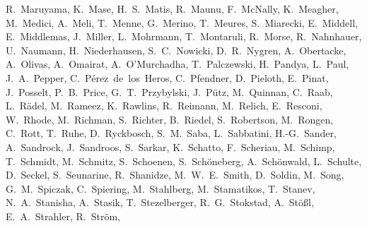 \documentclass[manuscript]{aastex}
\begin{document}
{R.~Maruyama,
K.~Mase,
H.~S.~Matis,
R.~Maunu,
F.~McNally,
K.~Meagher,
M.~Medici,
A.~Meli,
T.~Menne,
G.~Merino,
T.~Meures,
S.~Miarecki,
E.~Middell,
E.~Middlemas,
J.~Miller,
L.~Mohrmann,
T.~Montaruli,
R.~Morse,
R.~Nahnhauer,
U.~Naumann,
H.~Niederhausen,
S.~C.~Nowicki,
D.~R.~Nygren,
A.~Obertacke,
A.~Olivas,
A.~Omairat,
A.~O'Murchadha,
T.~Palczewski,
H.~Pandya,
L.~Paul,
J.~A.~Pepper,
C.~P\'erez~de~los~Heros,
C.~Pfendner,
D.~Pieloth,
E.~Pinat,
J.~Posselt,
P.~B.~Price,
G.~T.~Przybylski,
J.~P\"utz,
M.~Quinnan,
C.~Raab,
L.~R\"adel,
M.~Rameez,
K.~Rawlins,
R.~Reimann,
M.~Relich,
E.~Resconi,
W.~Rhode,
M.~Richman,
S.~Richter,
B.~Riedel,
S.~Robertson,
M.~Rongen,
C.~Rott,
T.~Ruhe,
D.~Ryckbosch,
S.~M.~Saba,
L.~Sabbatini,
H.-G.~Sander,
A.~Sandrock,
J.~Sandroos,
S.~Sarkar,
K.~Schatto,
F.~Scheriau,
M.~Schimp,
T.~Schmidt,
M.~Schmitz,
S.~Schoenen,
S.~Sch\"oneberg,
A.~Sch\"onwald,
L.~Schulte,
D.~Seckel,
S.~Seunarine,
R.~Shanidze,
M.~W.~E.~Smith,
D.~Soldin,
M.~Song,
G.~M.~Spiczak,
C.~Spiering,
M.~Stahlberg,
M.~Stamatikos,
T.~Stanev,
N.~A.~Stanisha,
A.~Stasik,
T.~Stezelberger,
R.~G.~Stokstad,
A.~St\"o{\ss}l,
E.~A.~Strahler,
R.~Str\"om,
}
\end{document}
